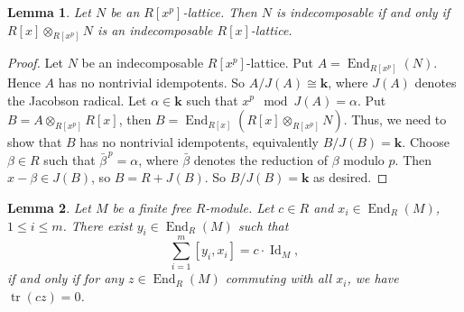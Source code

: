 \documentclass[12pt,letterpaper]{amsart}
\theoremstyle{plain}
\newtheorem{lemma}{Lemma}[section]
\theoremstyle{definition}
\DeclareMathOperator{\tr}{tr}
\DeclareMathOperator{\End}{End}
\DeclareMathOperator{\Id}{Id}
\begin{document}
\begin{lemma}\label{Frobenius-indecomposable}
Let $N$ be an $R[x^p]$-lattice. Then $N$ is indecomposable if and only if $R[x]\otimes_{R[x^p]}N$ is an indecomposable $R[x]$-lattice.
    
\end{lemma}
\begin{proof}
 Let $N$ be an indecomposable $R[x^p]$-lattice. Put $A=\End_{R[x^p]}(N)$. Hence $A$ has no nontrivial idempotents. 
So $A/J(A)\cong\mathbf{k}$, where $J(A)$ denotes the Jacobson radical. Let $\alpha\in \mathbf{k}$  such that $x^p\mod J(A)=\alpha$. 
 Put $B=A\otimes_{R[x^p]}R[x]$,  then $B=\End_{R[x]}(R[x]\otimes_{R[x^p]}N)$.  Thus, we need to show that $B$ has no nontrivial idempotents, equivalently $B/J(B)=\mathbf{k}$. Choose $\beta\in R$ such that $\bar\beta^{\,p}=\alpha$, where $\bar\beta$ denotes the reduction of $\beta$ modulo $p$. Then $x-\beta\in J(B)$,
 so $B=R+J(B)$. So $B/J(B)=\mathbf{k}$  as desired.

\end{proof}


\begin{lemma}\label{lemma:trace}
Let $M$ be a finite free $R$-module. Let $c\in R$ and $x_i \in \End_R(M)$, $1\leq i\leq m$.
There exist $y_i \in \End_R(M)$ such that
\[
\sum_{i=1}^m[y_i, x_i] = c \cdot \Id_M,
\]
if and only if for any $z \in \End_{R}(M)$ commuting with all $x_i$, we have $\tr(cz)=0$. 

\end{lemma}
\end{document}
